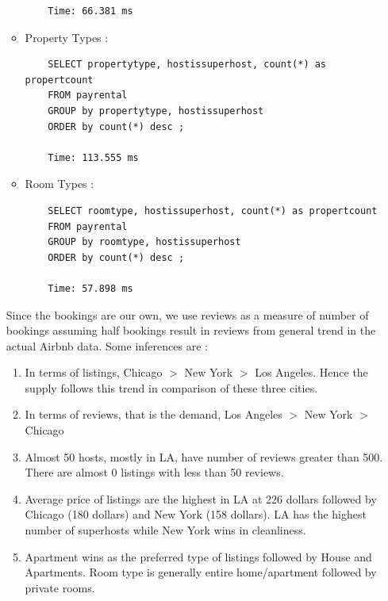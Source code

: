 \documentclass[10pt]{article}
\begin{document}
\begin{enumerate}
\begin{itemize}
\begin{verbatim}
    Time: 66.381 ms
    \end{verbatim}
    \item Property Types : 
    \begin{verbatim}
    SELECT propertytype, hostissuperhost, count(*) as propertcount
    FROM payrental
    GROUP by propertytype, hostissuperhost
    ORDER by count(*) desc ;

    Time: 113.555 ms
    \end{verbatim}
    
    \item Room Types :
    \begin{verbatim}
    SELECT roomtype, hostissuperhost, count(*) as propertcount
    FROM payrental
    GROUP by roomtype, hostissuperhost
    ORDER by count(*) desc ;

    Time: 57.898 ms
    \end{verbatim}
    
  \end{itemize}
  Since the bookings are our own, we use reviews as a measure of number of bookings assuming half bookings result in reviews from general trend in the actual Airbnb data. Some inferences are : 
  \begin{enumerate}
      \item In terms of listings, Chicago $>$ New York $>$ Los Angeles. Hence the supply follows this trend in comparison of these three cities.
      \item In terms of reviews, that is the demand, Los Angeles  $>$ New York  $>$ Chicago
      \item Almost 50 hosts, mostly in LA, have number of reviews greater than 500. There are almost 0 listings with less than 50 reviews.
      \item Average price of listings are the highest in LA at 226 dollars followed by Chicago (180 dollars) and New York (158 dollars). LA has the highest number of superhosts while New York wins in cleanliness. 
      \item Apartment wins as the preferred type of listings followed by House and Apartments. Room type is generally entire home/apartment followed by private rooms.
  \end{enumerate}
\end{enumerate}
\end{document}
